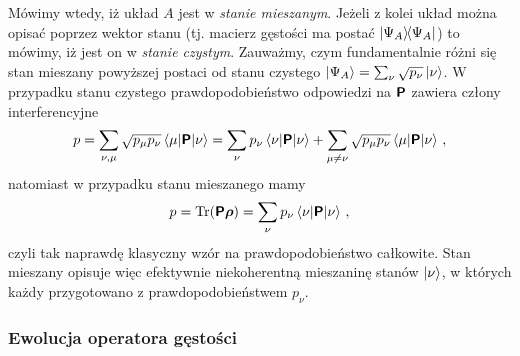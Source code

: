 \documentclass{myclass}
\begin{document}
Mówimy wtedy, iż układ \(A\) jest w \textit{stanie mieszanym}. Jeżeli z kolei układ można opisać
poprzez wektor stanu (tj. macierz gęstości ma postać \(\dyad{\Psi_A}\)) to mówimy, iż jest on w
\textit{stanie czystym}. Zauważmy, czym fundamentalnie różni się stan mieszany powyższej postaci od
stanu czystego \(\ket{\Psi_A} = \sum_\nu \sqrt{p_\nu} \ket{\nu}\). W przypadku stanu czystego
prawdopodobieństwo odpowiedzi na \(\boldsymbol{\mathsf{P}}\) zawiera człony interferencyjne
\begin{equation*}
    p = \sum_{\nu,\mu} \sqrt{p_\mu p_\nu}\mel{\mu}{\boldsymbol{\mathsf{P}}}{\nu} = \sum_{\nu} p_\nu \mel{\nu}{\boldsymbol{\mathsf{P}}}{\nu} + \sum_{\mu \neq \nu} \sqrt{p_\mu p_\nu}\mel{\mu}{\boldsymbol{\mathsf{P}}}{\nu}\,,
\end{equation*}
natomiast w przypadku stanu mieszanego mamy
\begin{equation*}
    p = \Trace(\oper{P\rho}) = \sum_\nu p_\nu \mel{\nu}{\oper{P}}{\nu}\,,
\end{equation*}
czyli tak naprawdę klasyczny wzór na prawdopodobieństwo całkowite. Stan mieszany opisuje więc
efektywnie niekoherentną mieszaninę stanów \(\ket{\nu}\), w których każdy przygotowano z
prawdopodobieństwem \(p_\nu\). 

\subsubsection*{Ewolucja operatora gęstości}
\end{document}
